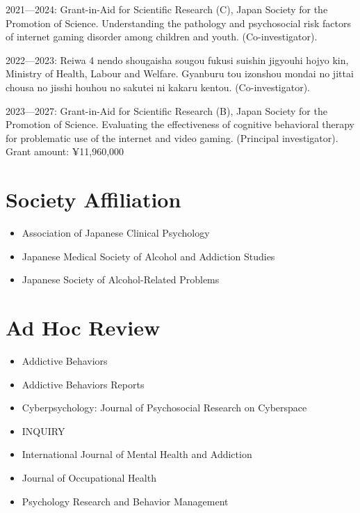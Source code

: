\documentclass[a4paper]{article}
\begin{document}
\begin{description}
	\item 2021---2024: Grant-in-Aid for Scientific Research (C), Japan Society for the Promotion of Science. Understanding the pathology and psychosocial risk factors of internet gaming disorder among children and youth. (Co-investigator).
	\item 2022---2023: Reiwa 4 nendo shougaisha sougou fukusi suishin jigyouhi hojyo kin, Ministry of Health, Labour and Welfare. Gyanburu tou izonshou mondai no jittai chousa no jisshi houhou no sakutei ni kakaru kentou. (Co-investigator).
	\item 2023---2027: Grant-in-Aid for Scientific Research (B), Japan Society for the Promotion of Science. Evaluating the effectiveness of cognitive behavioral therapy for problematic use of the internet and video gaming. (Principal investigator). Grant amount: ¥11,960,000
	\end{description}

\section{Society Affiliation}
\begin{itemize}
	\item Association of Japanese Clinical Psychology
	\item Japanese Medical Society of Alcohol and Addiction Studies
	\item Japanese Society of Alcohol-Related Problems
\end{itemize}

\section{Ad Hoc Review}
\begin{itemize}
	\item Addictive Behaviors
	\item Addictive Behaviors Reports
	\item Cyberpsychology: Journal of Psychosocial Research on Cyberspace 
	\item INQUIRY
	\item International Journal of Mental Health and Addiction
	\item Journal of Occupational Health
	\item Psychology Research and Behavior Management 
\end{itemize}
\end{document}

